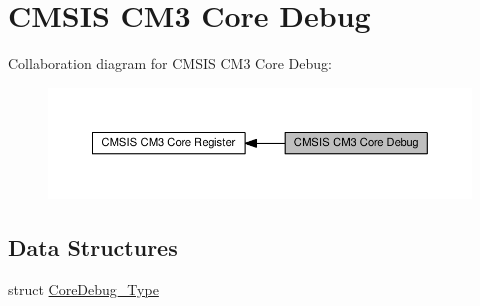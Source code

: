 \hypertarget{group__CMSIS__CM3__CoreDebug}{}\section{C\+M\+S\+IS C\+M3 Core Debug}
\label{group__CMSIS__CM3__CoreDebug}
Collaboration diagram for C\+M\+S\+IS C\+M3 Core Debug\+:\nopagebreak
\begin{figure}[H]
\begin{center}
\leavevmode
\includegraphics[width=350pt]{de/de9/group__CMSIS__CM3__CoreDebug}
\end{center}
\end{figure}
\subsection*{Data Structures}
\begin{DoxyCompactItemize}
\item 
struct \hyperlink{structCoreDebug__Type}{Core\+Debug\+\_\+\+Type}
\end{DoxyCompactItemize}
